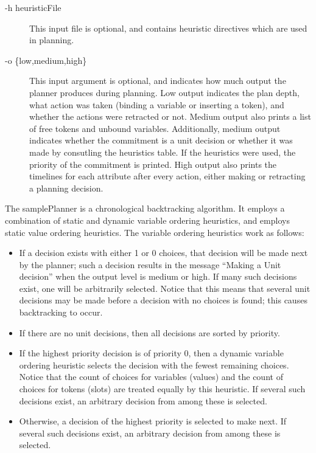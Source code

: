 \begin{description}
    \item [-h heuristicFile] This input file is optional, and contains heuristic directives
    which are used in planning.  

    \item [-o \{low,medium,high\}] This input argument is
    optional, and indicates how much output the planner produces
    during planning.  Low output indicates the plan depth, what
    action was taken (binding a variable or inserting a token),
    and whether the actions were retracted or not.  Medium output
    also prints a list of free tokens and unbound variables. 
    Additionally, medium output indicates whether the commitment
    is a unit decision or whether it was made by consutling the
    heuristics table.  If the heuristics were used, the priority
    of the commitment is printed.  High output also prints the
    timelines for each attribute after every action, either making
    or retracting a planning decision.
\end{description}

The samplePlanner is a chronological backtracking algorithm.  It employs a combination of
static and dynamic variable ordering heuristics, and employs static value ordering heuristics.
The variable ordering heuristics work as follows:
\begin{itemize}

\item If a decision exists with either 1 or 0 choices, that decision
will be made next by the planner; such a decision results in the
message ``Making a Unit decision'' when the output level is medium or
high.  If many such decisions exist, one will be arbitrarily selected. 
Notice that this means that several unit decisions may be made before
a decision with no choices is found; this causes backtracking to
occur.

\item If there are no unit decisions, then all decisions are sorted by
priority.

\item If the highest priority decision is of priority 0, then a
dynamic variable ordering heuristic selects the decision with the
fewest remaining choices.  Notice that the count of choices for
variables (values) and the count of choices for tokens (slots) are
treated equally by this heuristic.  If several such decisions exist,
an arbitrary decision from among these is selected.

\item Otherwise, a decision of the highest priority is selected to
make next.  If several such decisions exist, an arbitrary decision
from among these is selected.

\end{itemize}

